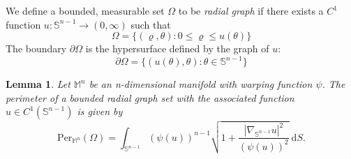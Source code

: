 \documentclass[a4paper,11pt,reqno]{amsart}
\theoremstyle{plain}
\newtheorem{lemma}{Lemma}[section]
\numberwithin{equation}{section} \allowdisplaybreaks
\newcommand{\m}{\mathbb{M}^n}
\newcommand{\sn}{\mathbb{S}^{n-1}}
\begin{document}
We define a bounded, measurable set $\Omega$ to be \textit{radial graph} if there exists a $C^1$ function $u: \sn\to (0,\infty)$ such that 
\begin{equation*}
    \Omega= \{(\varrho, \theta): 0 \leq \varrho \leq u(\theta)\}
\end{equation*}
The boundary $\partial \Omega$ is the hypersurface defined by the graph of $u$:
\begin{equation*}
    \partial \Omega=\{(u(\theta),\theta): \theta \in \sn\}
\end{equation*}
\vspace{-18pt}
\begin{lemma}
    Let $\m$ be an n-dimensional manifold with warping function $\psi$. The perimeter of a bounded radial graph set with the associated function $u \in C^1(\sn)$ is given by 
    \begin{equation*}
        \mathrm{Per}_{\m}(\Omega)=\int_{\sn}(\psi(u))^{n-1}\sqrt{1+\frac{|\nabla_{\sn}u|^2}{(\psi(u))^2}}\ \mathrm{d}S.
    \end{equation*}
\end{lemma}
\end{document}
